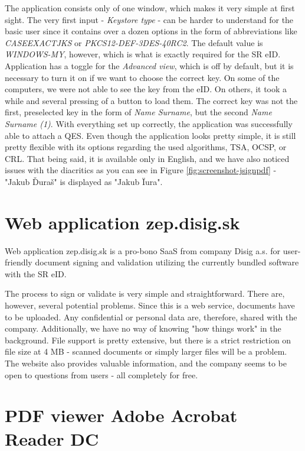 \documentclass[thesismargins, english, thesislinespacing, onelinechapterstyle, upjsfrontpage]{rnthesis}
\begin{document}
The application consists only of one window, which makes it very simple at first sight.
The very first input - \textit{Keystore type} - can be harder to understand for the basic user since it contains over a dozen options in the form of abbreviations like \textit{CASEEXACTJKS} or \textit{PKCS12-DEF-3DES-40RC2}.
The default value is \textit{WINDOWS-MY}, however, which is what is exactly required for the SR eID.
Application has a toggle for the \textit{Advanced view}, which is off by default, but it is necessary to turn it on if we want to choose the correct key.
On some of the computers, we were not able to see the key from the eID. On others, it took a while and several pressing of a button to load them.
The correct key was not the first, preselected key in the form of \textit{Name Surname}, but the second \textit{Name Surname (1)}.
With everything set up correctly, the application was successfully able to attach a QES.
Even though the application looks pretty simple, it is still pretty flexible with its options regarding the used algorithms, TSA, OCSP, or CRL.
That being said, it is available only in English, and we have also noticed issues with the diacritics as you can see in Figure \ref{fig:screenshot-jsignpdf} - "Jakub Ďuraš" is displayed as "Jakub Ïura".

\section{Web application zep.disig.sk}

Web application zep.disig.sk is a pro-bono SaaS from company Disig a.s. for user-friendly document signing and validation utilizing the currently bundled software with the SR eID.


The process to sign or validate is very simple and straightforward.
There are, however, several potential problems.
Since this is a web service, documents have to be uploaded.
Any confidential or personal data are, therefore, shared with the company.
Additionally, we have no way of knowing "how things work" in the background.
File support is pretty extensive, but there is a strict restriction on file size at 4 MB - scanned documents or simply larger files will be a problem.
The website also provides valuable information, and the company seems to be open to questions from users - all completely for free.

\section{PDF viewer Adobe Acrobat Reader DC}
\end{document}
